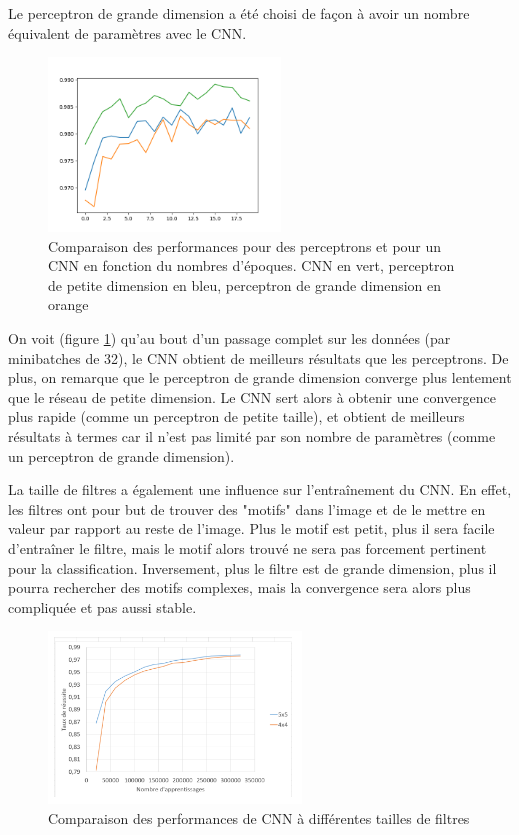Le perceptron de grande dimension a été choisi de façon à avoir un nombre équivalent de paramètres avec le CNN.

\begin{figure}[ht]
    \center 
    \includegraphics[width=0.55\textwidth]{img/fc_vs_cnn.png}
    \caption[Comparaison des performances pour des perceptrons et pour un CNN]{Comparaison des performances pour des perceptrons et pour un CNN en fonction du nombres d'époques. CNN en vert, perceptron de petite dimension en bleu, perceptron de grande dimension en orange}
    \label{fig:perceptron-cnn}
\end{figure}

On voit (figure \ref{fig:perceptron-cnn}) qu'au bout d'un passage complet sur les données (par minibatches de 32), le CNN obtient de meilleurs résultats que les 
perceptrons. De plus, on remarque que le perceptron de grande dimension converge plus lentement que le réseau de petite dimension.
Le CNN sert alors à obtenir une convergence plus rapide (comme un perceptron de petite taille),
et obtient de meilleurs résultats à termes car il n'est pas limité par son nombre de paramètres (comme un perceptron de grande dimension).

La taille de filtres a également une influence sur l'entraînement du CNN. En effet, les filtres ont pour but de trouver des "motifs" dans l'image et de le mettre en valeur par rapport au reste de l'image. Plus le motif est petit, plus il sera facile d'entraîner le filtre, mais le motif alors trouvé ne sera pas forcement pertinent pour la classification. Inversement, plus le filtre est de grande dimension, plus il pourra rechercher des motifs complexes, mais la convergence sera alors plus compliquée et pas aussi stable.


\begin{figure}[h]
    \center 
    \includegraphics[width=0.6\textwidth]{img/comparaison_filtres.png}
    \caption{Comparaison des performances de CNN à différentes tailles de filtres}
\end{figure}


